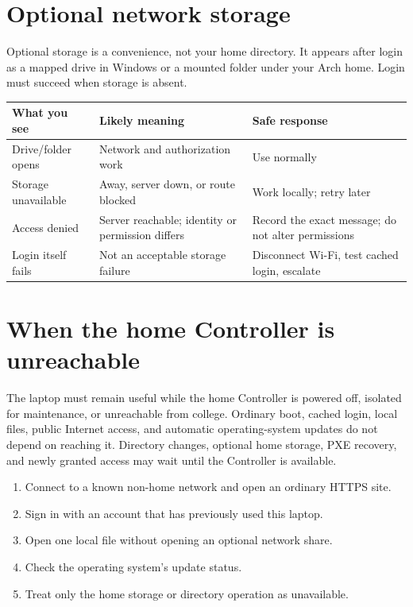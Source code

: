 \section{Optional network storage}

Optional storage is a convenience, not your home directory. It appears after
login as a mapped drive in Windows or a mounted folder under your Arch home.
Login must succeed when storage is absent.

\begin{tabularx}{\linewidth}{@{}p{.24\linewidth}p{.32\linewidth}L@{}}
\toprule
\textbf{What you see} & \textbf{Likely meaning} & \textbf{Safe response}\\
\midrule
Drive/folder opens & Network and authorization work & Use normally\\
Storage unavailable & Away, server down, or route blocked & Work locally;
retry later\\
Access denied & Server reachable; identity or permission differs & Record the
exact message; do not alter permissions\\
Login itself fails & Not an acceptable storage failure & Disconnect Wi-Fi,
test cached login, escalate\\
\bottomrule
\end{tabularx}


\section{When the home Controller is unreachable}

The laptop must remain useful while the home Controller is powered off,
isolated for maintenance, or unreachable from college. Ordinary boot, cached
login, local files, public Internet access, and automatic operating-system
updates do not depend on reaching it. Directory changes, optional home
storage, PXE recovery, and newly granted access may wait until the Controller
is available.

\begin{enumerate}
\item Connect to a known non-home network and open an ordinary HTTPS site.
\item Sign in with an account that has previously used this laptop.
\item Open one local file without opening an optional network share.
\item Check the operating system's update status.
\item Treat only the home storage or directory operation as unavailable.
\end{enumerate}

